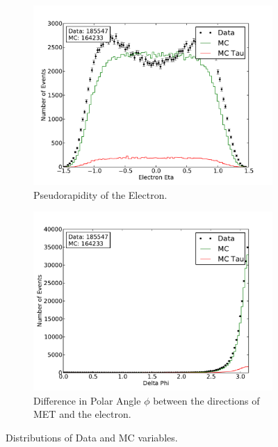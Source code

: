\documentclass[
	paper=A4,
	parskip=full,
	chapterprefix=true,
	11pt,
	headings=normal,
	bibliography=totoc,
	listof=totoc,
	titlepage=on,
]{scrreprt}
\begin{document}
\begin{figure}%
	\centering
	\begin{subfigure}{0.45\textwidth}
		\includegraphics{./nocuts/eta_el}
		\caption{Pseudorapidity of the Electron.}
	\end{subfigure}
	\begin{subfigure}{0.45\textwidth}
		\includegraphics{./nocuts/delta_phi}
		\caption{Difference in Polar Angle $\phi$ between the directions of MET and the electron.}
	\end{subfigure}
	\caption{Distributions of Data and MC variables.}
	\label{fig:no_cuts_etadphi}
\end{figure}
\end{document}
